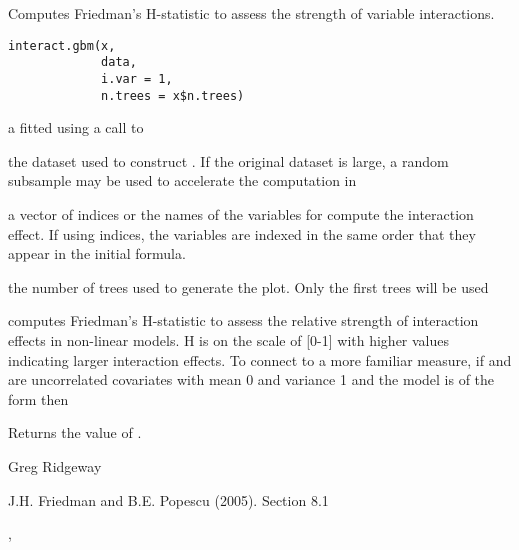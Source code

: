 \documentclass{article}
\begin{document}
\begin{Description}\relax
Computes Friedman's H-statistic to assess the strength of variable interactions.
\end{Description}
\begin{Usage}
\begin{verbatim}
interact.gbm(x,
             data,
             i.var = 1,
             n.trees = x$n.trees)
\end{verbatim}
\end{Usage}
\begin{Arguments}
\begin{ldescription}
\item[\code{x}] a  fitted using a call to 
\item[\code{data}] the dataset used to construct . If the original dataset is
large, a random subsample may be used to accelerate the computation in
\item[\code{i.var}] a vector of indices or the names of the variables for compute
the interaction effect. If using indices, the variables are indexed in the
same order that they appear in the initial  formula.
\item[\code{n.trees}] the number of trees used to generate the plot. Only the first
 trees will be used
\end{ldescription}
\end{Arguments}
\begin{Details}\relax
{} computes Friedman's H-statistic to assess the relative
strength of interaction effects in non-linear models. H is on the scale of
[0-1] with higher values indicating larger interaction effects. To connect to
a more familiar measure, if  and  are uncorrelated covariates
with mean 0 and variance 1 and the model is of the form
then
\end{Details}
\begin{Value}
Returns the value of .
\end{Value}
\begin{Author}\relax
Greg Ridgeway 
\end{Author}
\begin{References}\relax
J.H. Friedman and B.E. Popescu (2005).  Section 8.1
\end{References}
\begin{SeeAlso}\relax
{}, 
\end{SeeAlso}
\end{document}
